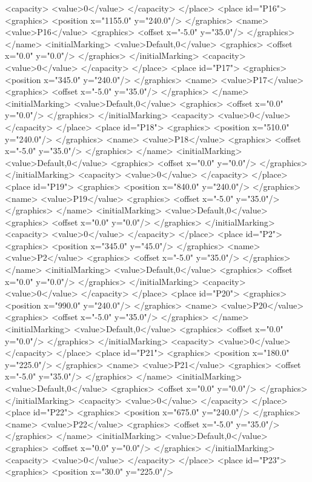 <capacity>
<value>0</value>
</capacity>
</place>
<place id="P16">
<graphics>
<position x="1155.0" y="240.0"/>
</graphics>
<name>
<value>P16</value>
<graphics>
<offset x="-5.0" y="35.0"/>
</graphics>
</name>
<initialMarking>
<value>Default,0</value>
<graphics>
<offset x="0.0" y="0.0"/>
</graphics>
</initialMarking>
<capacity>
<value>0</value>
</capacity>
</place>
<place id="P17">
<graphics>
<position x="345.0" y="240.0"/>
</graphics>
<name>
<value>P17</value>
<graphics>
<offset x="-5.0" y="35.0"/>
</graphics>
</name>
<initialMarking>
<value>Default,0</value>
<graphics>
<offset x="0.0" y="0.0"/>
</graphics>
</initialMarking>
<capacity>
<value>0</value>
</capacity>
</place>
<place id="P18">
<graphics>
<position x="510.0" y="240.0"/>
</graphics>
<name>
<value>P18</value>
<graphics>
<offset x="-5.0" y="35.0"/>
</graphics>
</name>
<initialMarking>
<value>Default,0</value>
<graphics>
<offset x="0.0" y="0.0"/>
</graphics>
</initialMarking>
<capacity>
<value>0</value>
</capacity>
</place>
<place id="P19">
<graphics>
<position x="840.0" y="240.0"/>
</graphics>
<name>
<value>P19</value>
<graphics>
<offset x="-5.0" y="35.0"/>
</graphics>
</name>
<initialMarking>
<value>Default,0</value>
<graphics>
<offset x="0.0" y="0.0"/>
</graphics>
</initialMarking>
<capacity>
<value>0</value>
</capacity>
</place>
<place id="P2">
<graphics>
<position x="345.0" y="45.0"/>
</graphics>
<name>
<value>P2</value>
<graphics>
<offset x="-5.0" y="35.0"/>
</graphics>
</name>
<initialMarking>
<value>Default,0</value>
<graphics>
<offset x="0.0" y="0.0"/>
</graphics>
</initialMarking>
<capacity>
<value>0</value>
</capacity>
</place>
<place id="P20">
<graphics>
<position x="990.0" y="240.0"/>
</graphics>
<name>
<value>P20</value>
<graphics>
<offset x="-5.0" y="35.0"/>
</graphics>
</name>
<initialMarking>
<value>Default,0</value>
<graphics>
<offset x="0.0" y="0.0"/>
</graphics>
</initialMarking>
<capacity>
<value>0</value>
</capacity>
</place>
<place id="P21">
<graphics>
<position x="180.0" y="225.0"/>
</graphics>
<name>
<value>P21</value>
<graphics>
<offset x="-5.0" y="35.0"/>
</graphics>
</name>
<initialMarking>
<value>Default,0</value>
<graphics>
<offset x="0.0" y="0.0"/>
</graphics>
</initialMarking>
<capacity>
<value>0</value>
</capacity>
</place>
<place id="P22">
<graphics>
<position x="675.0" y="240.0"/>
</graphics>
<name>
<value>P22</value>
<graphics>
<offset x="-5.0" y="35.0"/>
</graphics>
</name>
<initialMarking>
<value>Default,0</value>
<graphics>
<offset x="0.0" y="0.0"/>
</graphics>
</initialMarking>
<capacity>
<value>0</value>
</capacity>
</place>
<place id="P23">
<graphics>
<position x="30.0" y="225.0"/>
